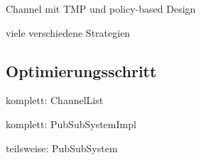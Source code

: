 \begin{itemize*}
\item Channel mit TMP und policy-based Design
\item viele verschiedene Strategien
\end{itemize*}

\subsection{Optimierungsschritt}
\begin{itemize*}
\item komplett: ChannelList
\item komplett: PubSubSystemImpl
\item teilsweise: PubSubSystem
\end{itemize*}




